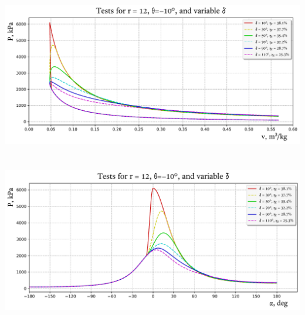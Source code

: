     \begin{frame}{}\vspace*{-2em}
        \begin{center}
            \includegraphics[height=70.0mm]{fig/test_r=12,0_speed-P.pdf}
        \end{center}
    \end{frame}

    \begin{frame}{}\vspace*{-2em}
        \begin{center}
            \includegraphics[height=70.0mm]{fig/test_r=12,0_speed-a.pdf}
        \end{center}
    \end{frame}

